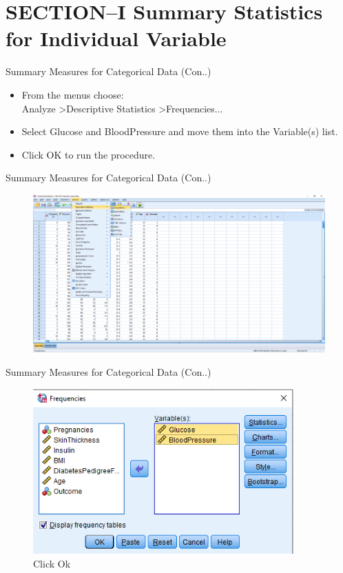


\maketitle
\section{SECTION--I Summary Statistics for Individual Variable}
\begin{frame}[t]{Summary Measures for Categorical Data (Con..)}
	\begin{itemize}
		\item From the menus choose:\\
		Analyze \textgreater Descriptive Statistics \textgreater Frequencies...\\
		\item Select Glucose and BloodPressure and move them into the Variable(s) list.
		\item Click OK to run the procedure.
	\end{itemize}
	
\end{frame}
\begin{frame}[t]{Summary Measures for Categorical Data (Con..)}
	\begin{figure}
		\centering
		\includegraphics[width=12cm]{img/freq_table1_1}
	\end{figure}
\end{frame}
\begin{frame}[t]{Summary Measures for Categorical Data (Con..)}
	\begin{figure}
		\centering
		\includegraphics[width=10cm]{img/freq_table1_2}
		\caption{Click Ok}
	\end{figure}
\end{frame}
